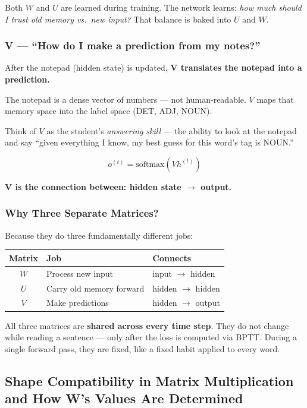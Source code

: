 \documentclass[12pt,a4paper]{article}
\begin{document}
Both $W$ and $U$ are learned during training. The network learns: \textit{how much should I trust old memory vs.\ new input?} That balance is baked into $U$ and $W$.

\subsubsection{V — ``How do I make a prediction from my notes?''}

After the notepad (hidden state) is updated, \textbf{V translates the notepad into a prediction.}

The notepad is a dense vector of numbers --- not human-readable. $V$ maps that memory space into the label space (DET, ADJ, NOUN).

Think of $V$ as the student's \textit{answering skill} --- the ability to look at the notepad and say ``given everything I know, my best guess for this word's tag is NOUN.''

\[
o^{(t)} = \text{softmax}\!\left(V h^{(t)}\right)
\]

\textbf{V is the connection between: hidden state $\rightarrow$ output.}

\subsubsection{Why Three Separate Matrices?}

Because they do three fundamentally different jobs:

\begin{center}
\begin{tabular}{|c|l|l|}
\hline
\textbf{Matrix} & \textbf{Job} & \textbf{Connects} \\
\hline
$W$ & Process new input & input $\rightarrow$ hidden \\
$U$ & Carry old memory forward & hidden $\rightarrow$ hidden \\
$V$ & Make predictions & hidden $\rightarrow$ output \\
\hline
\end{tabular}
\end{center}

All three matrices are \textbf{shared across every time step}. They do not change while reading a sentence --- only after the loss is computed via BPTT. During a single forward pass, they are fixed, like a fixed habit applied to every word.


\subsection{Shape Compatibility in Matrix Multiplication and How W's Values Are Determined}
\end{document}
